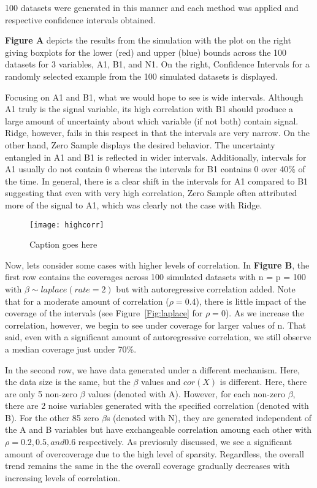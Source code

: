 100 datasets were generated in this manner and each method was applied and respective confidence intervals obtained.

\textbf{Figure A} depicts the results from the simulation with the plot on the right giving boxplots for the lower (red) and upper (blue) bounds across the 100 datasets for 3 variables, A1, B1, and N1. On the right, Confidence Intervals for a randomly selected example from the 100 simulated datasets is displayed.

Focusing on A1 and B1, what we would hope to see is wide intervals. Although A1 truly is the signal variable, its high correlation with B1 should produce a large amount of uncertainty about which variable (if not both) contain signal. Ridge, however, fails in this respect in that the intervals are very narrow. On the other hand, Zero Sample displays the desired behavior. The uncertainty entangled in A1 and B1 is reflected in wider intervals. Additionally, intervals for A1 usually do not contain 0 whereas the intervals for B1 contains 0 over 40\% of the time. In general, there is a clear shift in the intervals for A1 compared to B1 suggesting that even with very high correlation, Zero Sample often attributed more of the signal to A1, which was clearly not the case with Ridge.


\begin{figure}
  \texttt{[image: highcorr]}
  \caption{\label{Fig:highcorr} Caption goes here}
\end{figure}


Now, lets consider some cases with higher levels of correlation. In \textbf{Figure B}, the first row contains the coverages across 100 simulated datasets with n = p = 100 with $\beta \sim laplace(rate = 2)$ but with autoregressive correlation added. Note that for a moderate amount of correlation ($\rho = 0.4$), there is little impact of the coverage of the intervals (see Figure~\ref{Fig:laplace} for $\rho = 0$).  As we increase the correlation, however, we begin to see under coverage for larger values of n. That said, even with a significant amount of autoregressive correlation, we still observe a median coverage just under 70\%.

In the second row, we have data generated under a different mechanism. Here, the data size is the same, but the $\beta$ values and $cor(X)$ is different. Here, there are only 5 non-zero $\beta$ values (denoted with A). However, for each non-zero $\beta$, there are 2 noise variables generated with the specified correlation (denoted with B). For the other 85 zero $\beta$s (denoted with N), they are generated independent of the A and B variables but have exchangeable correlation amoung each other with $\rho = 0.2, 0.5, and 0.6$ respectively. As previosuly discussed, we see a significant amount of overcoverage due to the high level of sparsity. Regardless, the overall trend remains the same in the the overall coverage gradually decreases with increasing levels of correlation.

